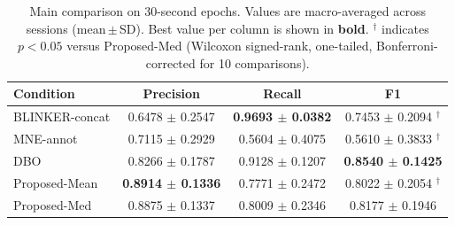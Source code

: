 \begin{table}[ht]
    \centering
    \caption{Main comparison on 30-second epochs. Values are macro-averaged across sessions
        (mean\,$\pm$\,SD). Best value per column is shown in \textbf{bold}.
        $^\dagger$ indicates $p < 0.05$ versus Proposed-Med (Wilcoxon signed-rank, one-tailed,
        Bonferroni-corrected for 10 comparisons).}
    \label{tab:exp1_main}
    \begin{tabular}{lccc}
        \toprule
        Condition & Precision & Recall & F1 \\
        \midrule
        BLINKER-concat & 0.6478 $\pm$ 0.2547 & \textbf{0.9693 $\pm$ 0.0382} & 0.7453 $\pm$ 0.2094 $^\dagger$ \\
        MNE-annot & 0.7115 $\pm$ 0.2929 & 0.5604 $\pm$ 0.4075 & 0.5610 $\pm$ 0.3833 $^\dagger$ \\
        DBO & 0.8266 $\pm$ 0.1787 & 0.9128 $\pm$ 0.1207 & \textbf{0.8540 $\pm$ 0.1425} \\
        Proposed-Mean & \textbf{0.8914 $\pm$ 0.1336} & 0.7771 $\pm$ 0.2472 & 0.8022 $\pm$ 0.2054 $^\dagger$ \\
        Proposed-Med & 0.8875 $\pm$ 0.1337 & 0.8009 $\pm$ 0.2346 & 0.8177 $\pm$ 0.1946 \\
        \bottomrule
    \end{tabular}
\end{table}
